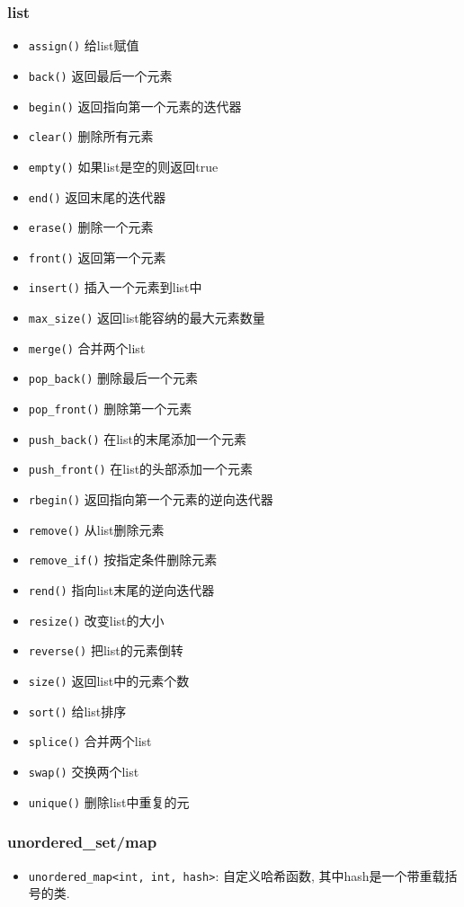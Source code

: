 \subsubsection{list}
	\begin{itemize}
		\item \texttt{assign()} 给list赋值 
		\item \texttt{back()} 返回最后一个元素 
		\item \texttt{begin()} 返回指向第一个元素的迭代器 
		\item \texttt{clear()} 删除所有元素 
		\item \texttt{empty()} 如果list是空的则返回true 
		\item \texttt{end()} 返回末尾的迭代器
		\item \texttt{erase()} 删除一个元素
		\item \texttt{front()} 返回第一个元素
		\item \texttt{insert()} 插入一个元素到list中
		\item \texttt{max_size()} 返回list能容纳的最大元素数量
		\item \texttt{merge()} 合并两个list
		\item \texttt{pop_back()} 删除最后一个元素
		\item \texttt{pop_front()} 删除第一个元素
		\item \texttt{push_back()} 在list的末尾添加一个元素
		\item \texttt{push_front()} 在list的头部添加一个元素
		\item \texttt{rbegin()} 返回指向第一个元素的逆向迭代器
		\item \texttt{remove()} 从list删除元素
		\item \texttt{remove_if()} 按指定条件删除元素
		\item \texttt{rend()} 指向list末尾的逆向迭代器
		\item \texttt{resize()} 改变list的大小
		\item \texttt{reverse()} 把list的元素倒转
		\item \texttt{size()} 返回list中的元素个数
		\item \texttt{sort()} 给list排序
		\item \texttt{splice()} 合并两个list
		\item \texttt{swap()} 交换两个list
		\item \texttt{unique()} 删除list中重复的元
	\end{itemize}

\subsubsection{unordered\_set/map}

\begin{itemize}
	\item \texttt{unordered_map<int, int, hash>}: 自定义哈希函数, 其中hash是一个带重载括号的类.
\end{itemize}